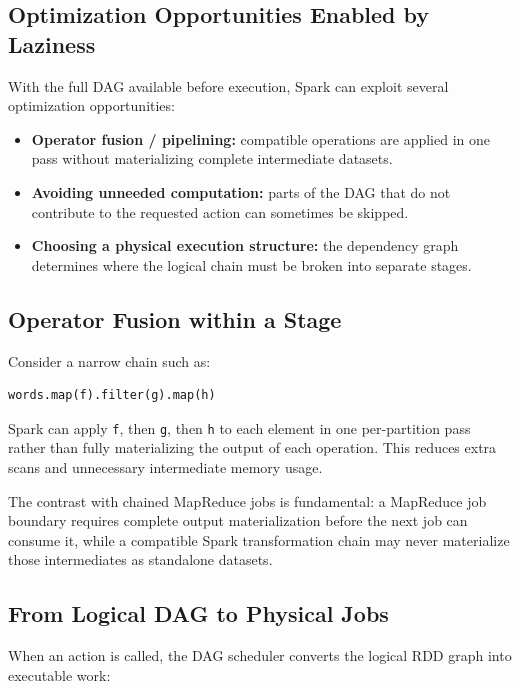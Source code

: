 \documentclass[11pt,a4paper,oneside]{book}
\begin{document}
\subsection{Optimization Opportunities Enabled by Laziness}

With the full DAG available before execution, Spark can exploit several optimization opportunities:

\begin{itemize}
    \item \textbf{Operator fusion / pipelining:} compatible operations are applied in one pass without materializing complete intermediate datasets.
    \item \textbf{Avoiding unneeded computation:} parts of the DAG that do not contribute to the requested action can sometimes be skipped.
    \item \textbf{Choosing a physical execution structure:} the dependency graph determines where the logical chain must be broken into separate stages.
\end{itemize}

\subsection{Operator Fusion within a Stage}

Consider a narrow chain such as:

\begin{lstlisting}[style=sparkcode]
words.map(f).filter(g).map(h)
\end{lstlisting}

Spark can apply \texttt{f}, then \texttt{g}, then \texttt{h} to each element in one per-partition pass rather than fully materializing the output of each operation. This reduces extra scans and unnecessary intermediate memory usage.

The contrast with chained MapReduce jobs is fundamental: a MapReduce job boundary requires complete output materialization before the next job can consume it, while a compatible Spark transformation chain may never materialize those intermediates as standalone datasets.

\subsection{From Logical DAG to Physical Jobs}

When an action is called, the DAG scheduler converts the logical RDD graph into executable work:
\end{document}
